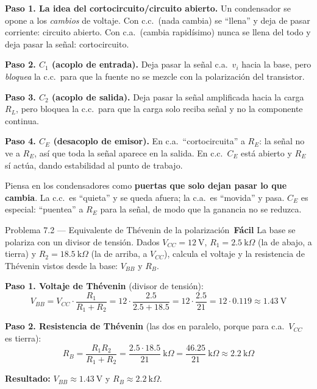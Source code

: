 \documentclass[11pt,a4paper]{article}
\newcommand{\facil}{\textcolor{verdeSignal}{\faIcon{circle}\,\textbf{Fácil}}}
\begin{document}
\begin{solucionBox}
\textbf{Paso 1. La idea del cortocircuito/circuito abierto.} Un condensador se opone a los \emph{cambios} de voltaje. Con c.c.\ (nada cambia) se ``llena'' y deja de pasar corriente: circuito abierto. Con c.a.\ (cambia rapidísimo) nunca se llena del todo y deja pasar la señal: cortocircuito.

\textbf{Paso 2. $C_1$ (acoplo de entrada).} Deja pasar la señal c.a.\ $v_i$ hacia la base, pero \emph{bloquea} la c.c.\ para que la fuente no se mezcle con la polarización del transistor.

\textbf{Paso 3. $C_2$ (acoplo de salida).} Deja pasar la señal amplificada hacia la carga $R_L$, pero bloquea la c.c.\ para que la carga solo reciba señal y no la componente continua.

\textbf{Paso 4. $C_E$ (desacoplo de emisor).} En c.a.\ ``cortocircuita'' a $R_E$: la señal no ve a $R_E$, así que toda la señal aparece en la salida. En c.c.\ $C_E$ está abierto y $R_E$ sí actúa, dando estabilidad al punto de trabajo.
\end{solucionBox}

\begin{porqueBox}
Piensa en los condensadores como \textbf{puertas que solo dejan pasar lo que cambia}. La c.c.\ es ``quieta'' y se queda afuera; la c.a.\ es ``movida'' y pasa. $C_E$ es especial: ``puentea'' a $R_E$ para la señal, de modo que la ganancia no se reduzca.
\end{porqueBox}

\begin{problemaBox}{Problema 7.2 --- Equivalente de Thévenin de la polarización \quad \facil}
La base se polariza con un divisor de tensión. Dados $V_{CC}=12\ \text{V}$, $R_1=2.5\ \text{k}\Omega$ (la de abajo, a tierra) y $R_2=18.5\ \text{k}\Omega$ (la de arriba, a $V_{CC}$), calcula el voltaje y la resistencia de Thévenin vistos desde la base: $V_{BB}$ y $R_B$.
\end{problemaBox}

\begin{solucionBox}
\textbf{Paso 1. Voltaje de Thévenin} (divisor de tensión):
\[
V_{BB}=V_{CC}\cdot\frac{R_1}{R_1+R_2}=12\cdot\frac{2.5}{2.5+18.5}=12\cdot\frac{2.5}{21}=12\cdot 0.119\approx 1.43\ \text{V}
\]

\textbf{Paso 2. Resistencia de Thévenin} (las dos en paralelo, porque para c.a.\ $V_{CC}$ es tierra):
\[
R_B=\frac{R_1 R_2}{R_1+R_2}=\frac{2.5\cdot 18.5}{21}\ \text{k}\Omega=\frac{46.25}{21}\ \text{k}\Omega\approx 2.2\ \text{k}\Omega
\]

\textbf{Resultado:} $V_{BB}\approx 1.43\ \text{V}$ y $R_B\approx 2.2\ \text{k}\Omega$.
\end{solucionBox}
\end{document}
